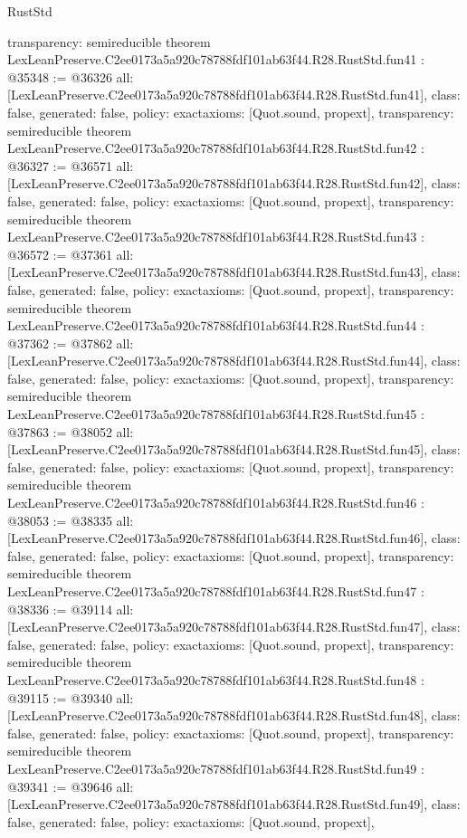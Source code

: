 \begin{lexlean}{RustStd}
\begin{coremodule}
{  transparency: semireducible
}
theorem LexLeanPreserve.C2ee0173a5a920c78788fdf101ab63f44.R28.RustStd.fun41 : @35348 := @36326 {
  all: [LexLeanPreserve.C2ee0173a5a920c78788fdf101ab63f44.R28.RustStd.fun41],
  class: false,
  generated: false,
  policy: exact{axioms: [Quot.sound, propext]},
  transparency: semireducible
}
theorem LexLeanPreserve.C2ee0173a5a920c78788fdf101ab63f44.R28.RustStd.fun42 : @36327 := @36571 {
  all: [LexLeanPreserve.C2ee0173a5a920c78788fdf101ab63f44.R28.RustStd.fun42],
  class: false,
  generated: false,
  policy: exact{axioms: [Quot.sound, propext]},
  transparency: semireducible
}
theorem LexLeanPreserve.C2ee0173a5a920c78788fdf101ab63f44.R28.RustStd.fun43 : @36572 := @37361 {
  all: [LexLeanPreserve.C2ee0173a5a920c78788fdf101ab63f44.R28.RustStd.fun43],
  class: false,
  generated: false,
  policy: exact{axioms: [Quot.sound, propext]},
  transparency: semireducible
}
theorem LexLeanPreserve.C2ee0173a5a920c78788fdf101ab63f44.R28.RustStd.fun44 : @37362 := @37862 {
  all: [LexLeanPreserve.C2ee0173a5a920c78788fdf101ab63f44.R28.RustStd.fun44],
  class: false,
  generated: false,
  policy: exact{axioms: [Quot.sound, propext]},
  transparency: semireducible
}
theorem LexLeanPreserve.C2ee0173a5a920c78788fdf101ab63f44.R28.RustStd.fun45 : @37863 := @38052 {
  all: [LexLeanPreserve.C2ee0173a5a920c78788fdf101ab63f44.R28.RustStd.fun45],
  class: false,
  generated: false,
  policy: exact{axioms: [Quot.sound, propext]},
  transparency: semireducible
}
theorem LexLeanPreserve.C2ee0173a5a920c78788fdf101ab63f44.R28.RustStd.fun46 : @38053 := @38335 {
  all: [LexLeanPreserve.C2ee0173a5a920c78788fdf101ab63f44.R28.RustStd.fun46],
  class: false,
  generated: false,
  policy: exact{axioms: [Quot.sound, propext]},
  transparency: semireducible
}
theorem LexLeanPreserve.C2ee0173a5a920c78788fdf101ab63f44.R28.RustStd.fun47 : @38336 := @39114 {
  all: [LexLeanPreserve.C2ee0173a5a920c78788fdf101ab63f44.R28.RustStd.fun47],
  class: false,
  generated: false,
  policy: exact{axioms: [Quot.sound, propext]},
  transparency: semireducible
}
theorem LexLeanPreserve.C2ee0173a5a920c78788fdf101ab63f44.R28.RustStd.fun48 : @39115 := @39340 {
  all: [LexLeanPreserve.C2ee0173a5a920c78788fdf101ab63f44.R28.RustStd.fun48],
  class: false,
  generated: false,
  policy: exact{axioms: [Quot.sound, propext]},
  transparency: semireducible
}
theorem LexLeanPreserve.C2ee0173a5a920c78788fdf101ab63f44.R28.RustStd.fun49 : @39341 := @39646 {
  all: [LexLeanPreserve.C2ee0173a5a920c78788fdf101ab63f44.R28.RustStd.fun49],
  class: false,
  generated: false,
  policy: exact{axioms: [Quot.sound, propext]},
}
\end{coremodule}
\end{lexlean}
